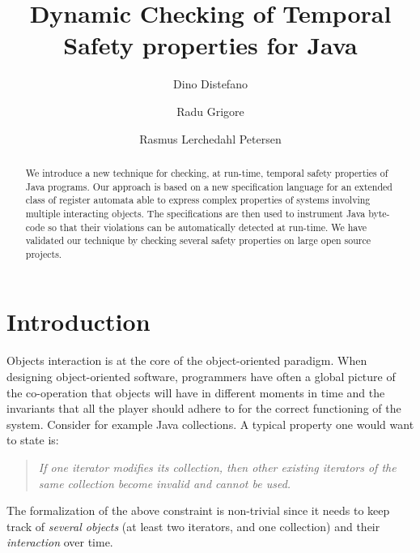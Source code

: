 \documentclass{llncs} %
\title{Dynamic Checking of Temporal Safety properties for Java}
\author{Dino Distefano \and Radu Grigore \and Rasmus Lerchedahl Petersen}
\institute{Queen Mary University of London }
\begin{document}
\maketitle

\begin{abstract} %
We introduce a new technique for checking, at run-time, temporal safety properties of Java programs.
Our approach is based on a new specification language for an extended class of register automata able to express complex properties of 
systems involving multiple interacting objects. The specifications are then used to instrument Java byte-code so that their violations can be automatically detected at run-time. 
We have validated our technique by checking several safety properties on large open source projects.
\end{abstract}


\section{Introduction} %
Objects interaction is at the core of the object-oriented paradigm. When designing object-oriented software, 
programmers have often  a global picture of the co-operation that objects will have in different moments in time and the 
invariants that all the player should adhere to for the correct functioning of the system.
Consider for  example  Java collections. A typical property one would want to state is:
\begin{quote}
{\em If one iterator modifies its collection, then other existing iterators of the same collection become invalid and cannot be used.}
\end{quote}
\noindent
The formalization of the above constraint is non-trivial since it 
needs to keep track of {\em several objects} (at least two iterators, and one collection) and their {\em interaction} over time.
\end{document}
